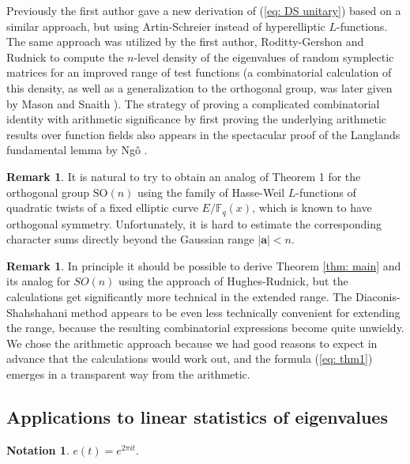\documentclass[alphabetic, 
        colorlinks,
        linkcolor=red,  citecolor=blue,
        backref
]{amsart}
\numberwithin{equation}{section}
\theoremstyle{definition}
\newtheorem{rem}[claim]{Remark}
\newtheorem{notation}[claim]{Notation}
\newcommand{\SO}{{\mathrm{SO}}}
\newcommand{\F}{\mathbb{F}}
\begin{document}
Previously the first author \cite{Ent14} gave a new derivation of (\ref{eq: DS unitary}) based on a similar approach, but using Artin-Schreier instead of hyperelliptic $L$-functions. The same approach was utilized by the first author, Roditty-Gershon and Rudnick \cite{ERR13} to compute the $n$-level density of the eigenvalues of random symplectic matrices for an improved range of test functions (a combinatorial calculation of this density, as well as a generalization to the orthogonal group, was later given by Mason and Snaith \cite{MaSn17}). The strategy of proving a complicated combinatorial identity with arithmetic significance by first proving the underlying arithmetic results over function fields also appears in the spectacular proof of the Langlands fundamental lemma by Ng\^o \cite{Ngo10}.

\begin{rem} It is natural to try to obtain an analog of Theorem 1 for the orthogonal group $\SO(n)$ using the family of Hasse-Weil $L$-functions of quadratic twists of a fixed elliptic curve $E/\F_q(x)$, which is known to have orthogonal symmetry. Unfortunately, it is hard to estimate the corresponding character sums directly beyond the Gaussian range $|\mathbf a|<n$.\end{rem}

\begin{rem} In principle it should be possible to derive Theorem \ref{thm: main} and its analog for $SO(n)$ using the approach of Hughes-Rudnick, but the calculations get significantly more technical in the extended range. The Diaconis-Shahshahani method appears to be even less technically convenient for extending the range, because the resulting combinatorial expressions become quite unwieldy. We chose the arithmetic approach because we had good reasons to expect in advance that the calculations would work out, and the formula (\ref{eq: thm1}) emerges in a transparent way from the arithmetic.
\end{rem}

\subsection{Applications to linear statistics of eigenvalues}

\begin{notation}
    $e(t)=e^{2\pi it}$.
\end{notation}
\end{document}
